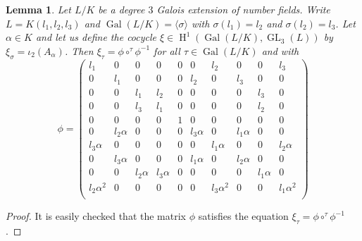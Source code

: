 \documentclass[a4paper,10pt]{amsart}
\theoremstyle{plain}
\newtheorem{lemma}[theorem]{Lemma}
\theoremstyle{definition}
\theoremstyle{remark}
\numberwithin{equation}{section}
\begin{document}
\begin{lemma}\label{lemma_iso}Let $L/K$ be a degree $3$ Galois extension of number fields. Write $L=K(l_1,l_2,l_3)$ and $\operatorname{Gal}(L/K)=\langle\sigma\rangle$ with $\sigma(l_1)=l_2$ and $\sigma(l_2)=l_3$. Let $\alpha\in K$ and let us define the cocycle $\xi\in\operatorname{H}^1(\operatorname{Gal}(L/K),\operatorname{GL}_3(L))$ by $\xi_\sigma=\iota_2(A_{\alpha})$. Then $\xi_\tau=\phi\circ^{\tau}\phi^{-1}$ for all $\tau\in\operatorname{Gal}(L/K)$ and with
	$$
	\phi=\begin{pmatrix}
	l_1 & 0 & 0 & 0 & 0 & 0 & l_2 & 0 & 0 & l_3 \\
	0 & l_1 & 0 & 0 & 0 & l_2 & 0 & l_3 & 0 & 0 \\
	0 & 0 & l_1 & l_2 & 0 & 0 & 0 & 0 & l_3 & 0 \\
	0 & 0 & l_3 & l_1 & 0 & 0 & 0 & 0 & l_2 & 0 \\
	0 & 0 & 0 & 0 & 1 & 0 & 0 & 0 & 0 & 0 \\
	0 & l_2\alpha & 0 & 0 & 0 & l_3\alpha & 0 & l_1\alpha & 0 & 0 \\
	l_3\alpha & 0 & 0 & 0 & 0 & 0 & l_1\alpha & 0 & 0 & l_2\alpha \\
	0 & l_3\alpha & 0 & 0 & 0 & l_1\alpha & 0 & l_2\alpha & 0 & 0 \\
	0 & 0 & l_2\alpha & l_3\alpha & 0 & 0 & 0 & 0 & l_1\alpha & 0 \\
	l_2\alpha^2 & 0 & 0 & 0 & 0 & 0 & l_3\alpha^2 & 0 & 0 & l_1\alpha^2 \\
	\end{pmatrix}
	$$
\end{lemma}
\begin{proof} It is easily checked that the matrix $\phi$ satisfies the equation $\xi_\tau=\phi\circ^{\tau}\phi^{-1}$.
\end{proof}
\end{document}
